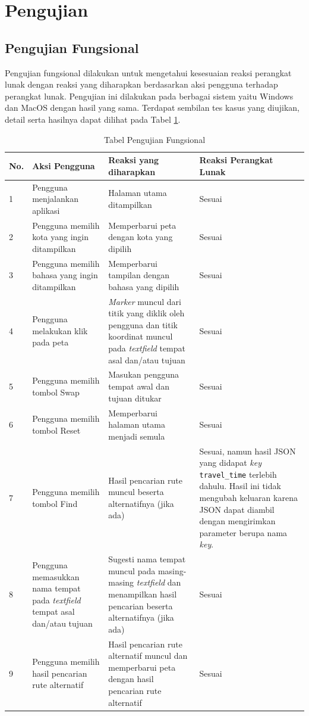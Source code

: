 \section{Pengujian}
\subsection{Pengujian Fungsional}

Pengujian fungsional dilakukan untuk mengetahui kesesuaian reaksi perangkat lunak dengan reaksi yang diharapkan berdasarkan aksi pengguna terhadap perangkat lunak. Pengujian ini dilakukan pada berbagai sistem yaitu Windows dan MacOS dengan hasil yang sama. Terdapat sembilan tes kasus yang diujikan, detail serta hasilnya dapat dilihat pada Tabel \ref{table:hasilFungsional}.
			
\begin{table}[H]
	\centering
	\caption{Tabel Pengujian Fungsional}
		\begin{tabular}{|p{0.25cm}| p{3.5cm}| p{7cm}| p{2.5cm}|} \hline
		No.	&	Aksi Pengguna	&	Reaksi yang diharapkan	&	Reaksi Perangkat Lunak \\ \hline
		1 & Pengguna menjalankan aplikasi & Halaman utama ditampilkan & Sesuai \\ \hline
2 & Pengguna memilih kota yang ingin ditampilkan & Memperbarui peta dengan kota yang dipilih & Sesuai \\ \hline
3 & Pengguna memilih bahasa yang ingin ditampilkan & Memperbarui tampilan dengan bahasa yang dipilih & Sesuai \\ \hline
4 & Pengguna melakukan klik pada peta & \textit{Marker} muncul dari titik yang diklik oleh pengguna dan titik koordinat muncul pada \textit{textfield} tempat asal dan/atau tujuan & Sesuai \\ \hline
5 & Pengguna memilih tombol Swap & Masukan pengguna tempat awal dan tujuan ditukar & Sesuai \\ \hline
6 & Pengguna memilih tombol Reset & Memperbarui halaman utama menjadi semula & Sesuai \\ \hline
7 & Pengguna memilih tombol Find & Hasil pencarian rute muncul beserta alternatifnya (jika ada) & Sesuai, namun hasil JSON yang didapat \textit{key} \verb!travel_time! terlebih dahulu. Hasil ini tidak mengubah keluaran karena JSON dapat diambil dengan mengirimkan parameter berupa nama \textit{key}. \\ \hline
8 & Pengguna memasukkan nama tempat pada \textit{textfield} tempat asal dan/atau tujuan & Sugesti nama tempat muncul pada masing-masing \textit{textfield} dan menampilkan hasil pencarian beserta alternatifnya (jika ada) & Sesuai \\ \hline
9 & Pengguna memilih hasil pencarian rute alternatif & Hasil pencarian rute alternatif muncul dan memperbarui peta dengan hasil pencarian rute alternatif & Sesuai \\ \hline
		
		\end{tabular}
	\label{table:hasilFungsional}
\end{table}


